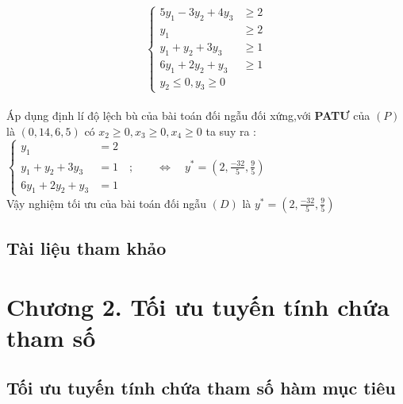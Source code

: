 \documentclass{article}
\begin{document}
\[\left\{\begin{aligned}
5y_1-3y_2+4y_3&\geq2 \\
y_1&\geq2 \\
y_1+y_2+3y_3&\geq1 \\
6y_1+2y_2+y_3&\geq1 \\
y_2\leq 0,y_3\geq 0
\end{aligned}\right.\]\\

Áp dụng định lí độ lệch bù của bài toán đối ngẫu đối xứng,với \textbf{PATƯ} của $\left(P\right)$ là $\left(0,14,6,5\right)$ có $x_2\geq 0,x_3\geq 0,x_4\geq 0$ ta suy ra :$\left\{\begin{aligned} 
y_1&=2 \\
y_1+y_2+3y_3&=1\quad;\qquad  \Longleftrightarrow \quad y^*=\left(2,\frac{-32}{5},\frac{9}{5}\right)\\
6y_1+2y_2+y_3&=1 
\end{aligned}\right.$\\
Vậy nghiệm tối ưu của bài toán đối ngẫu $\left(D\right)$ là $y^*=\left(2,\frac{-32}{5},\frac{9}{5}\right)$

\subsection{Tài liệu tham khảo}


\cleardoublepage
\section*{Chương 2. Tối ưu tuyến tính chứa tham số}
\subsection{Tối ưu tuyến tính chứa tham số hàm mục tiêu}



           
\end{document}
